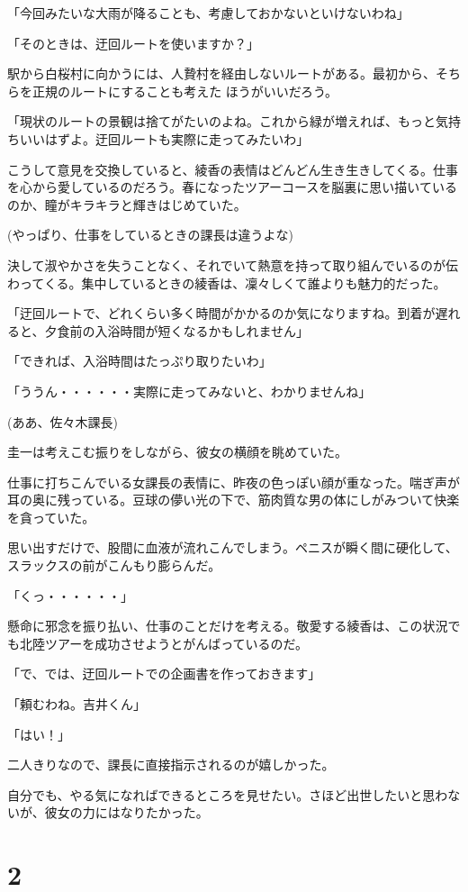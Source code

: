 ﻿\documentclass[book,tate]{jlreq}
\begin{document}
「今回みたいな大雨が降ることも、考慮しておかないといけないわね」

「そのときは、迂回ルートを使いますか？」

駅から白桜村に向かうには、人贄村を経由しないルートがある。最初から、そちらを正規のルートにすることも考えた ほうがいいだろう。

「現状のルートの景観は捨てがたいのよね。これから緑が増えれば、もっと気持ちいいはずよ。迂回ルートも実際に走ってみたいわ」

こうして意見を交換していると、綾香の表情はどんどん生き生きしてくる。仕事を心から愛しているのだろう。春になったツアーコースを脳裏に思い描いているのか、瞳がキラキラと輝きはじめていた。

(やっぱり、仕事をしているときの課長は違うよな)

決して淑やかさを失うことなく、それでいて熱意を持って取り組んでいるのが伝わってくる。集中しているときの綾香は、凜々しくて誰よりも魅力的だった。

「迂回ルートで、どれくらい多く時間がかかるのか気になりますね。到着が遅れると、夕食前の入浴時間が短くなるかもしれません」

「できれば、入浴時間はたっぷり取りたいわ」

「ううん・・・・・・実際に走ってみないと、わかりませんね」

(ああ、佐々木課長)

圭一は考えこむ振りをしながら、彼女の横顔を眺めていた。

仕事に打ちこんでいる女課長の表情に、昨夜の色っぽい顔が重なった。喘ぎ声が耳の奥に残っている。豆球の儚い光の下で、筋肉質な男の体にしがみついて快楽を貪っていた。

思い出すだけで、股間に血液が流れこんでしまう。ペニスが瞬く間に硬化して、スラックスの前がこんもり膨らんだ。

「くっ・・・・・・」

懸命に邪念を振り払い、仕事のことだけを考える。敬愛する綾香は、この状況でも北陸ツアーを成功させようとがんばっているのだ。

「で、では、迂回ルートでの企画書を作っておきます」

「頼むわね。吉井くん」

「はい！」

二人きりなので、課長に直接指示されるのが嬉しかった。

自分でも、やる気になればできるところを見せたい。さほど出世したいと思わないが、彼女の力にはなりたかった。

\section*{2}
\end{document}
